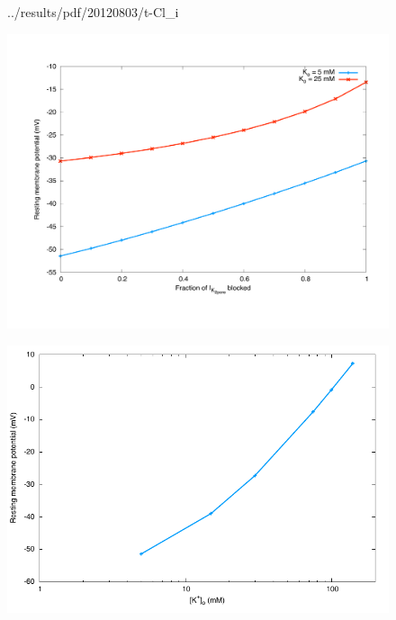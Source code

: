 \begin{figure}
{  {../results/pdf/20120803/t-Cl_i}}
  \subfloat{\hspace{0.50\textwidth}}\\
  \caption{}
  \label{fig:concentrations}
\end{figure}

\clearpage
\begin{landscape}
\begin{figure}
  \centering
  \includegraphics[width=1.0\textwidth]
    {../results/pdf/20120803/I_K_2pore_vs_RMP}
  \caption{}
  \label{fig:I-K-2pore-rmp}
\end{figure}
\end{landscape}

\clearpage
\begin{landscape}
\begin{figure}
  \centering
  \includegraphics[width=1.0\textwidth]
    {../results/pdf/20120803/K_o_vs_RMP}
  \caption{}
  \label{fig:K_o-rmp}
\end{figure}
\end{landscape}

